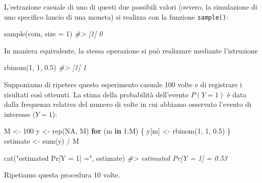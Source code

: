 \documentclass[
  11pt,
]{krantz}
\makeatletter
\newenvironment{Shaded}{\begin{snugshade}}{\end{snugshade}}
\newcommand{\AttributeTok}[1]{\textcolor[rgb]{0.61,0.61,0.61}{#1}}
\newcommand{\CommentTok}[1]{\textcolor[rgb]{0.37,0.37,0.37}{\textit{#1}}}
\newcommand{\ConstantTok}[1]{\textcolor[rgb]{0,0,0}{#1}}
\newcommand{\ControlFlowTok}[1]{\textcolor[rgb]{0.27,0.27,0.27}{\textbf{#1}}}
\newcommand{\DecValTok}[1]{\textcolor[rgb]{0.06,0.06,0.06}{#1}}
\newcommand{\FloatTok}[1]{\textcolor[rgb]{0.06,0.06,0.06}{#1}}
\newcommand{\FunctionTok}[1]{\textcolor[rgb]{0,0,0}{#1}}
\newcommand{\NormalTok}[1]{#1}
\newcommand{\OtherTok}[1]{\textcolor[rgb]{0.37,0.37,0.37}{#1}}
\newcommand{\SpecialCharTok}[1]{\textcolor[rgb]{0,0,0}{#1}}
\newcommand{\StringTok}[1]{\textcolor[rgb]{0.5,0.5,0.5}{#1}}
\newenvironment{kframe}{%
\medskip{}
\setlength{\fboxsep}{.8em}
 \def\at@end@of@kframe{}%
 \ifinner\ifhmode%
  \def\at@end@of@kframe{\end{minipage}}%
  \begin{minipage}{\columnwidth}%
 \fi\fi%
 \def\FrameCommand##1{\hskip\@totalleftmargin \hskip-\fboxsep
 \colorbox{shadecolor}{##1}\hskip-\fboxsep
     \hskip-\linewidth \hskip-\@totalleftmargin \hskip\columnwidth}%
 \MakeFramed {\advance\hsize-\width
   \@totalleftmargin\z@ \linewidth\hsize
   \@setminipage}}%
 {\par\unskip\endMakeFramed%
 \at@end@of@kframe}
\renewenvironment{Shaded}{\begin{kframe}}{\end{kframe}}
\theoremstyle{definition}
\theoremstyle{definition}
\theoremstyle{definition}
\theoremstyle{definition}
\theoremstyle{remark}
\makeatother
\begin{document}
L'estrazione casuale di uno di questi due possibili valori (ovvero, la simulazione di uno specifico lancio di una moneta) si realizza con la funzione \texttt{sample()}:

\begin{Shaded}
\begin{Highlighting}[]
\FunctionTok{sample}\NormalTok{(coin, }\AttributeTok{size =} \DecValTok{1}\NormalTok{)}
\CommentTok{\#\textgreater{} [1] 0}
\end{Highlighting}
\end{Shaded}

In maniera equivalente, la stessa operazione si può realizzare mediante l'istruzione

\begin{Shaded}
\begin{Highlighting}[]
\FunctionTok{rbinom}\NormalTok{(}\DecValTok{1}\NormalTok{, }\DecValTok{1}\NormalTok{, }\FloatTok{0.5}\NormalTok{)}
\CommentTok{\#\textgreater{} [1] 1}
\end{Highlighting}
\end{Shaded}

Supponiamo di ripetere questo esperimento casuale 100 volte e di registrare i risultati così ottenuti. La stima della probabilità dell'evento \(P(Y = 1)\) è data dalla frequenza relativa del numero di volte in cui abbiamo osservato l'evento di interesse (\(Y = 1\)):

\begin{Shaded}
\begin{Highlighting}[]
\NormalTok{M }\OtherTok{\textless{}{-}} \DecValTok{100}
\NormalTok{y }\OtherTok{\textless{}{-}} \FunctionTok{rep}\NormalTok{(}\ConstantTok{NA}\NormalTok{, M)}
\ControlFlowTok{for}\NormalTok{ (m }\ControlFlowTok{in} \DecValTok{1}\SpecialCharTok{:}\NormalTok{M) \{}
\NormalTok{  y[m] }\OtherTok{\textless{}{-}} \FunctionTok{rbinom}\NormalTok{(}\DecValTok{1}\NormalTok{, }\DecValTok{1}\NormalTok{, }\FloatTok{0.5}\NormalTok{)}
\NormalTok{\}}
\NormalTok{estimate }\OtherTok{\textless{}{-}} \FunctionTok{sum}\NormalTok{(y) }\SpecialCharTok{/}\NormalTok{ M}

\FunctionTok{cat}\NormalTok{(}\StringTok{"estimated Pr[Y = 1] ="}\NormalTok{, estimate)}
\CommentTok{\#\textgreater{} estimated Pr[Y = 1] = 0.53}
\end{Highlighting}
\end{Shaded}

Ripetiamo questa procedura 10 volte.
\end{document}
